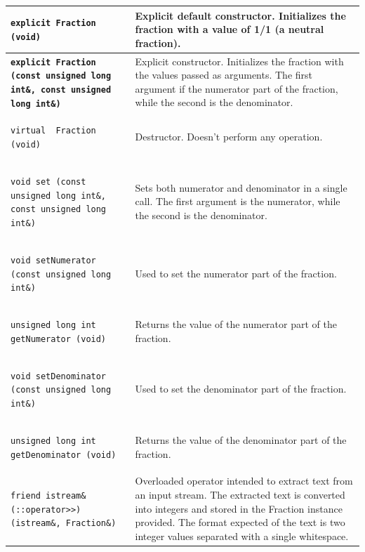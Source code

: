\documentclass[11pt,twoside,openany,x11names,svgnames]{memoir}
\begin{document}
\begin{table}[h]\footnotesize
\centering
\begin{tabular}{| >{\bfseries}p{9cm} | p{6.5cm} |}
	\hline
	
	\texttt{explicit Fraction (void)} & Explicit default constructor. Initializes the fraction with a value of 1/1 (a neutral fraction). \\
	
	\hline
	
	\texttt{explicit Fraction (const unsigned long int\&, const unsigned long int\&)} & Explicit constructor. Initializes the fraction with the values passed as arguments. The first argument if the numerator part of the fraction, while the second is the denominator. \\
	
	\hline
	
	\texttt{virtual ~Fraction (void)} & Destructor. Doesn't perform any operation. \\
	
	\hline
	
	\texttt{void set (const unsigned long int\&, const unsigned long int\&)} & Sets both numerator and denominator in a single call. The first argument is the numerator, while the second is the denominator. \\
	
	\hline	
	
	\texttt{void setNumerator (const unsigned long int\&)} & Used to set the numerator part of the fraction. \\
	
	\hline
	
	\texttt{unsigned long int getNumerator (void)} & Returns the value of the numerator part of the fraction. \\
	
	\hline	
	
	\texttt{void setDenominator (const unsigned long int\&)} & Used to set the denominator part of the fraction. \\
	
	\hline
	
	\texttt{unsigned long int getDenominator (void)} & Returns the value of the denominator part of the fraction. \\
	
	\hline
	
	\texttt{friend istream\& (::operator>>) (istream\&, Fraction\&)} & Overloaded operator intended to extract text from an input stream. The extracted text is converted into integers and stored in the Fraction instance provided. The format expected of the text is two integer values separated with a single whitespace. \\
	

\end{tabular}
\end{table}
\end{document}

